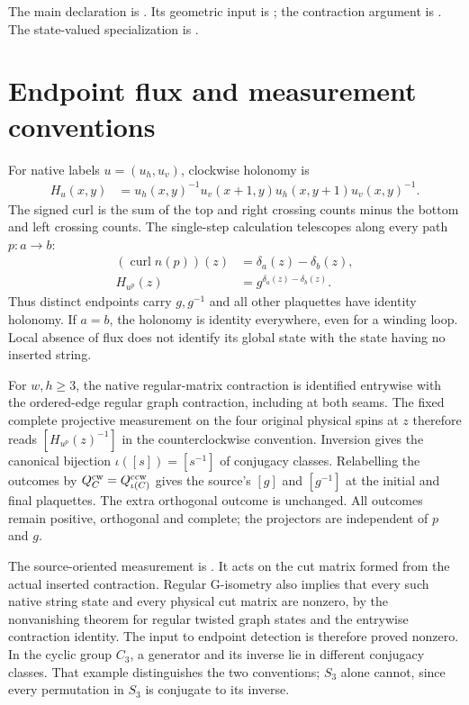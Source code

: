 \documentclass{article}
\begin{document}
The main declaration is
.
Its geometric input is
;
the contraction argument is
.
The state-valued specialization is
.

\section{Endpoint flux and measurement conventions}
For native labels $u=(u_h,u_v)$, clockwise holonomy is
\begin{align}
    H_u(x,y) & =u_h(x,y)^{-1}u_v(x+1,y)u_h(x,y+1)u_v(x,y)^{-1}.
\end{align}
The signed curl is the sum of the top and right crossing counts minus
the bottom and left crossing counts. The single-step calculation
telescopes along every path $p:a\to b$:
\begin{align}
    (\operatorname{curl}n(p))(z) & =\delta_a(z)-\delta_b(z),     \\
    H_{u^p}(z)                   & =g^{\delta_a(z)-\delta_b(z)}.
    \label{eq:flux_gap_endpoints}
\end{align}
Thus distinct endpoints carry $g,g^{-1}$ and all other plaquettes
have identity holonomy. If $a=b$, the holonomy is identity everywhere,
even for a winding loop. Local absence of flux does not identify its
global state with the state having no inserted string.

For $w,h\geq3$, the native regular-matrix contraction is identified
entrywise with the ordered-edge regular graph contraction, including
at both seams. The fixed complete projective measurement on the four
original physical spins at $z$ therefore reads $[H_{u^p}(z)^{-1}]$
in the counterclockwise convention. Inversion gives the canonical
bijection $\iota([s])=[s^{-1}]$ of conjugacy classes. Relabelling the
outcomes by $Q_C^{\rm cw}=Q_{\iota(C)}^{\rm ccw}$ gives the source's
$[g]$ and $[g^{-1}]$ at the initial and final plaquettes. The extra
orthogonal outcome is unchanged. All outcomes remain positive,
orthogonal and complete; the projectors are independent of $p$ and $g$.

The source-oriented measurement is
.
It acts on the cut matrix formed from the actual inserted contraction.
Regular G-isometry also implies that every such native string state and
every physical cut matrix are nonzero, by the nonvanishing theorem for
regular twisted graph states and the entrywise contraction identity.
The input to endpoint detection is therefore proved nonzero. In the cyclic group $C_3$,
a generator and its inverse lie in different conjugacy classes. That
example distinguishes the two conventions; $S_3$ alone cannot, since
every permutation in $S_3$ is conjugate to its inverse.
\end{document}
